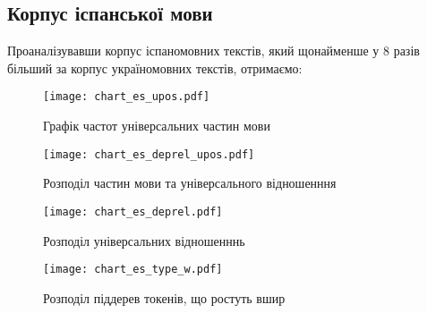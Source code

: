\newpage

\subsection{Корпус іспанської мови}
Проаналізувавши корпус іспаномовних текстів, який щонайменше у 8 разів
більший за корпус україномовних текстів, отримаємо:

\begin{multicols}{2}
\begin{figure}[H]
  \begin{center}
    \texttt{[image: chart\_es\_upos.pdf]}
  \end{center}
  \caption{Графік частот універсальних частин мови}
  \label{img:es_upos}
\end{figure}

\begin{figure}[H]
  \begin{center}
    \texttt{[image: chart\_es\_deprel\_upos.pdf]}
  \end{center}
  \caption{Розподіл частин мови та універсального відношенння}
  \label{img:es_deprel_upos}
\end{figure}

\begin{figure}[H]
  \begin{center}
    \texttt{[image: chart\_es\_deprel.pdf]}
  \end{center}
  \caption{Розподіл універсальних відношенннь}
  \label{img:es0}
\end{figure}

\begin{figure}[H]
  \begin{center}
    \texttt{[image: chart\_es\_type\_w.pdf]}
  \end{center}
  \caption{Розподіл піддерев токенів, що ростуть вшир}
  \label{img:es3}
\end{figure}



\end{multicols}

